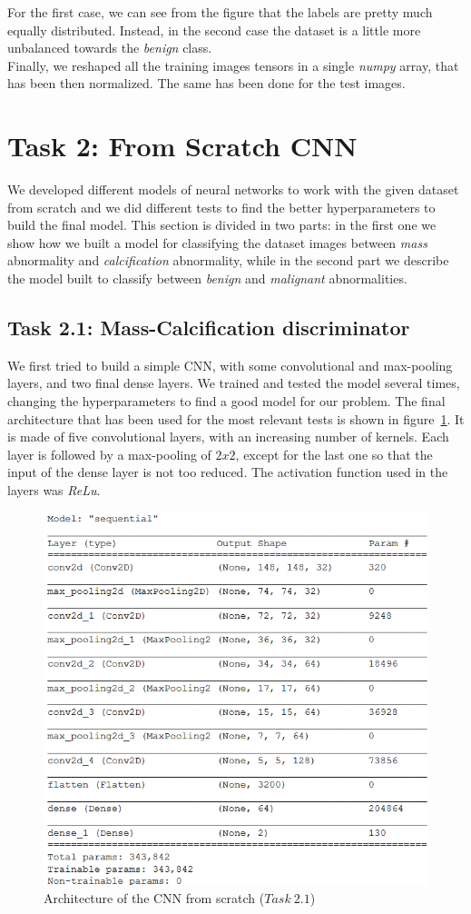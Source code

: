 \documentclass[11pt,a4paper,oneside]{article}
\begin{document}
For the first case, we can see from the figure that the labels are pretty much equally distributed. Instead, in the second case the dataset is a little more unbalanced towards the \textit{benign} class. \\
Finally, we reshaped all the training images tensors in a single \textit{numpy} array, that has been then normalized. The same has been done for the test images. 


\section{Task 2: From Scratch CNN}
We developed different models of neural networks to work with the given dataset from scratch and we did different tests to find the better hyperparameters to build the final model. This section is divided in two parts: in the first one we show how we built a model for classifying the dataset images between \textit{mass} abnormality and \textit{calcification} abnormality, while in the second part we describe the model built to classify between \textit{benign} and \textit{malignant} abnormalities.

\subsection{Task 2.1: Mass-Calcification discriminator}
We first tried to build a simple CNN, with some convolutional and max-pooling layers, and two final dense layers. We trained and tested the model several times, changing the hyperparameters to find a good model for our problem. The final architecture that has been used for the most relevant tests is shown in figure~\ref{fig:scratch_model}. It is made of five convolutional layers, with an increasing number of kernels. Each layer is followed by a max-pooling of $2x2$, except for the last one so that the input of the dense layer is not too reduced. The activation function used in the layers was \textit{ReLu}.

\begin{figure}[h]
\centering
\includegraphics[width=.5\textwidth]{images/scratch_model}
\caption{Architecture of the CNN from scratch ($Task\ 2.1$)}
\label{fig:scratch_model}
\end{figure}
\end{document}
